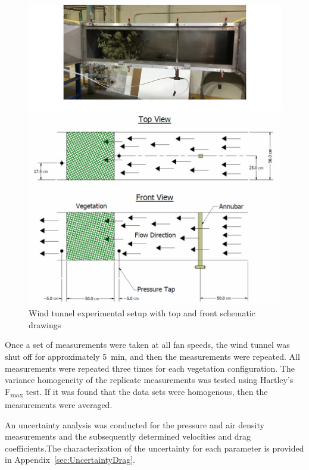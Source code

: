 \documentclass[12pt]{article}
\begin{document}
\begin{figure} [!]
	\centering 	
    \includegraphics[width=\textwidth,keepaspectratio]{Picture6a.jpg}
	\caption[Wind tunnel experimental setup]{Wind tunnel experimental setup with top and front schematic drawings }
	\label{fig:WindtunnelPic}
\end{figure}


Once a set of measurements were taken at all fan speeds, the wind tunnel was shut off for approximately 5~\si{min}, and then the measurements were repeated. All measurements were repeated three times for each vegetation configuration. The variance homogeneity of the replicate measurements was tested using Hartley's F\textsubscript{max} test. If it was found that the data sets were homogenous, then the measurements were averaged.

An uncertainty analysis was conducted for the pressure and air density measurements and the subsequently determined velocities and drag coefficients.The characterization of the uncertainty for each parameter is provided in Appendix~\ref{sec:UncertaintyDrag}.
\end{document}
